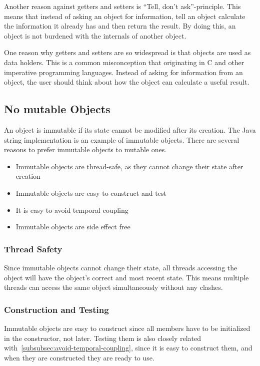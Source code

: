 Another reason against getters and setters is ``Tell, don't ask''-principle.
This means that instead of asking an object for information, tell an object calculate the information it already has and then return the result.
By doing this, an object is not burdened with the internals of another object.\cite{tell-dont-ask}

One reason why getters and setters are so widespread is that objects are used as data holders.
This is a common misconception that originating in C and other imperative programming languages.
Instead of asking for information from an object, the user should think about how the object can calculate a useful result.\cite{elegant-objects}

\subsection{No mutable Objects}\label{subsec:no-mutable-objects}
An object is immutable if its state cannot be modified after its creation.
The Java string implementation is an example of immutable objects.
There are several reasons to prefer immutable objects to mutable ones.\cite{elegant-objects}

\begin{itemize}
    \item Immutable objects are thread-safe, as they cannot change their state after creation
    \item Immutable objects are easy to construct and test
    \item It is easy to avoid temporal coupling
    \item Immutable objects are side effect free
\end{itemize}

\subsubsection{Thread Safety}
Since immutable objects cannot change their state, all threads accessing the object will have the object's correct and most recent state.
This means multiple threads can access the same object simultaneously without any clashes.

\subsubsection{Construction and Testing}
Immutable objects are easy to construct since all members have to be initialized in the constructor, not later.
Testing them is also closely related with\ \ref{subsubsec:avoid-temporal-coupling}, since it is easy to construct them, and when they are constructed they are ready to use.

